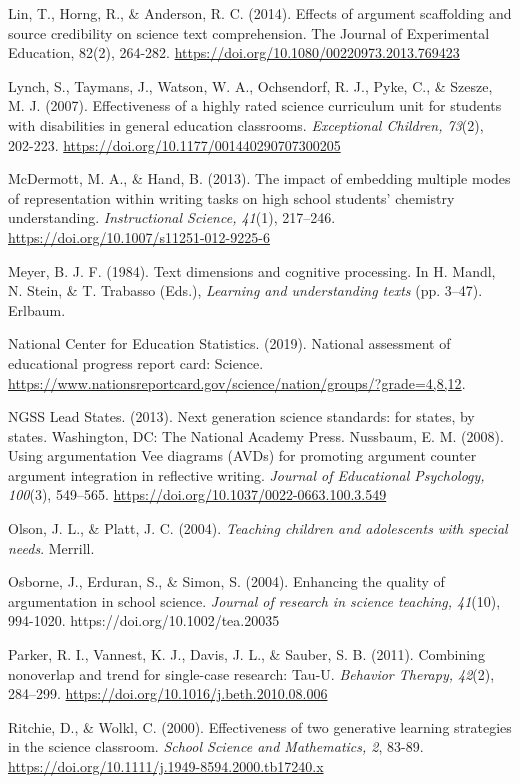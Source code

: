 \documentclass[11.5pt]{sig-alternate} %
\begin{document}
Lin, T., Horng, R., \& Anderson, R. C. (2014). Effects of argument scaffolding and source credibility on science text comprehension. The Journal of Experimental Education, 82(2), 264-282. \url{https://doi.org/10.1080/00220973.2013.769423}

Lynch, S., Taymans, J., Watson, W. A., Ochsendorf, R. J., Pyke, C., \& Szesze, M. J. (2007). Effectiveness of a highly rated science curriculum unit for students with disabilities in general education classrooms. \textit{Exceptional Children, 73}(2), 202-223. \url{https://doi.org/10.1177/001440290707300205}

McDermott, M. A., \& Hand, B. (2013). The impact of embedding multiple modes of representation within writing tasks on high school students’ chemistry understanding. \textit{Instructional Science, 41}(1), 217–246. \url{https://doi.org/10.1007/s11251-012-9225-6} 

Meyer, B. J. F. (1984). Text dimensions and cognitive processing. In H. Mandl, N. Stein, \& T. Trabasso (Eds.), \textit{Learning and understanding texts} (pp. 3–47). Erlbaum.

National Center for Education Statistics. (2019). National assessment of educational progress report card: Science. \url{https://www.nationsreportcard.gov/science/nation/groups/?grade=4,8,12}. 

NGSS Lead States. (2013). Next generation science standards: for states, by states. Washington, DC: The National Academy Press. 
Nussbaum, E. M. (2008). Using argumentation Vee diagrams (AVDs) for promoting argument counter argument integration in reflective writing. \textit{Journal of Educational Psychology, 100}(3), 549–565. \url{https://doi.org/10.1037/0022-0663.100.3.549}

Olson, J. L., \& Platt, J. C. (2004). \textit{Teaching children and adolescents with special needs}. Merrill.

Osborne, J., Erduran, S., \& Simon, S. (2004). Enhancing the quality of argumentation in school science. \textit{Journal of research in science teaching, 41}(10), 994-1020. https://doi.org/10.1002/tea.20035

Parker, R. I., Vannest, K. J., Davis, J. L., \& Sauber, S. B. (2011). Combining nonoverlap and trend for single-case research: Tau-U. \textit{Behavior Therapy, 42}(2), 284–299. \url{https://doi.org/10.1016/j.beth.2010.08.006}

Ritchie, D., \& Wolkl, C. (2000). Effectiveness of two generative learning strategies in the science classroom. \textit{School Science and Mathematics, 2}, 83-89. \url{https://doi.org/10.1111/j.1949-8594.2000.tb17240.x}
\end{document}
